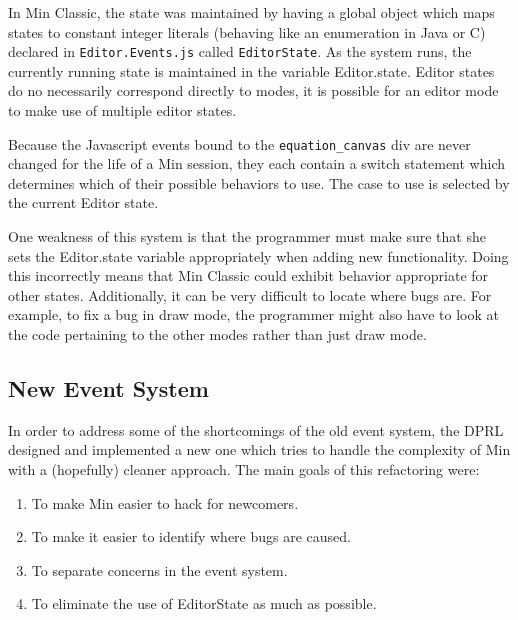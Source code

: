 \documentclass[letterpaper]{article}
\begin{document}
In Min Classic, the state was maintained by having a global
object which maps states to constant integer literals (behaving like an enumeration in Java or C)
declared in \verb+Editor.Events.js+ called \verb+EditorState+.
As the system runs, the currently running state is maintained in the variable
Editor.state. Editor states do no necessarily correspond directly to modes, it
is possible for an editor mode to make use of multiple editor states. 

Because the Javascript events bound to the \verb+equation_canvas+ div are never
changed for the life of a Min session, they each contain a switch statement
which determines which of their possible behaviors to use. The case to use is
selected by the current Editor state.

One weakness of this system is that the programmer must make sure that she sets
the Editor.state variable appropriately when adding new functionality. Doing
this incorrectly means that Min Classic could exhibit behavior appropriate for
other states. Additionally, it can be very difficult to locate where bugs are.
For example, to fix a bug in draw mode, the programmer might also have to look
at the code pertaining to the other modes rather than just draw mode.  

\subsection*{New Event System}

In order to address some of the shortcomings of the old event system, the DPRL
designed and implemented a new one which tries to handle the complexity of Min
with a (hopefully) cleaner approach. The main goals of this refactoring were:

\begin{enumerate}
    \item To make Min easier to hack for newcomers.  
    \item To make it easier to identify where bugs are caused.
    \item To separate concerns in the event system.
    \item To eliminate the use of EditorState as much as possible.
\end{enumerate}
\end{document}
